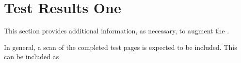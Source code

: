 
\chapter{Test Results One}
\label{loc:TestResultsOne}


This section provides additional information, as necessary, to augment the \STR.

In general, a scan of the completed \STS test pages is expected to be included.
This can be included as 

\ifpdf

\else
\fi